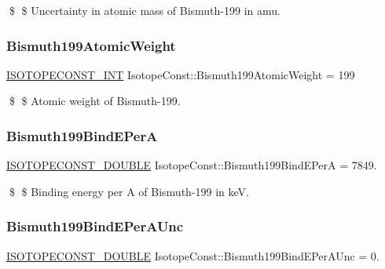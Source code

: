 \$ \$ Uncertainty in atomic mass of Bismuth-\/199 in amu. \mbox{\label{group___isotope_const-_bismuth-_bi199_ga0daf20c99f0fac78eb34445c0148eec8}} 
\subsubsection{\texorpdfstring{Bismuth199\+Atomic\+Weight}{Bismuth199AtomicWeight}}
{\footnotesize\ttfamily \mbox{\hyperlink{group___isotope_const-_macros_ga5f18360b3e99483a35c32d789e62621c}{I\+S\+O\+T\+O\+P\+E\+C\+O\+N\+S\+T\+\_\+\+I\+NT}} Isotope\+Const\+::\+Bismuth199\+Atomic\+Weight = 199}

\$ \$ Atomic weight of Bismuth-\/199. \mbox{\label{group___isotope_const-_bismuth-_bi199_ga30424cbb9148e3c63a3607a454914da0}} 
\subsubsection{\texorpdfstring{Bismuth199\+Bind\+E\+PerA}{Bismuth199BindEPerA}}
{\footnotesize\ttfamily \mbox{\hyperlink{group___isotope_const-_macros_ga8f45a7272ce02c0b4c65c44636ed719a}{I\+S\+O\+T\+O\+P\+E\+C\+O\+N\+S\+T\+\_\+\+D\+O\+U\+B\+LE}} Isotope\+Const\+::\+Bismuth199\+Bind\+E\+PerA = 7849.}

\$ \$ Binding energy per A of Bismuth-\/199 in keV. \mbox{\label{group___isotope_const-_bismuth-_bi199_ga16aa4b8067477f7f83cab6ff45bf6338}} 
\subsubsection{\texorpdfstring{Bismuth199\+Bind\+E\+Per\+A\+Unc}{Bismuth199BindEPerAUnc}}
{\footnotesize\ttfamily \mbox{\hyperlink{group___isotope_const-_macros_ga8f45a7272ce02c0b4c65c44636ed719a}{I\+S\+O\+T\+O\+P\+E\+C\+O\+N\+S\+T\+\_\+\+D\+O\+U\+B\+LE}} Isotope\+Const\+::\+Bismuth199\+Bind\+E\+Per\+A\+Unc = 0.}

